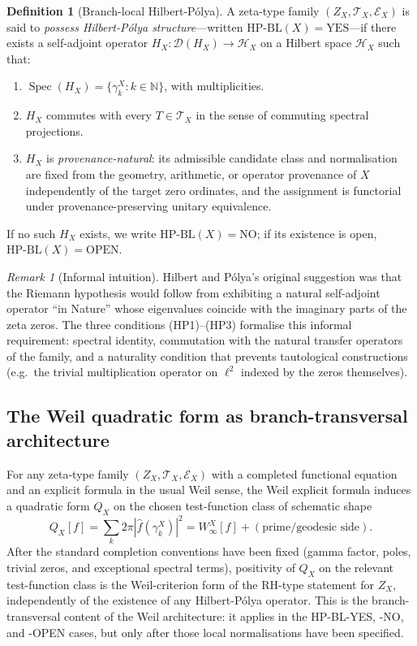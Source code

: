 \documentclass[11pt]{article}
\theoremstyle{definition}
\newtheorem{definition}[theorem]{Definition}
\theoremstyle{remark}
\newtheorem{remark}[theorem]{Remark}
\newcommand{\HBL}{\mathrm{HP\text{-}BL}}
\newcommand{\Spec}{\operatorname{Spec}}
\begin{document}
\begin{definition}[Branch-local Hilbert-P\'olya]\label{def:hp-bl}
A zeta-type family $(Z_X, \mathcal{T}_X, \mathcal{E}_X)$ is said to
\emph{possess Hilbert-P\'olya structure}---written $\HBL(X) =
\mathrm{YES}$---if there exists a self-adjoint operator
$H_X : \mathcal{D}(H_X) \to \mathcal{H}_X$ on a Hilbert space
$\mathcal{H}_X$ such that:
\begin{enumerate}
\item[(HP1)] $\Spec(H_X) = \{\gamma_k^X : k \in \mathbb{N}\}$, with
  multiplicities.
\item[(HP2)] $H_X$ commutes with every $T \in \mathcal{T}_X$ in the
  sense of commuting spectral projections.
\item[(HP3)] $H_X$ is \emph{provenance-natural}: its admissible
  candidate class and normalisation are fixed from the geometry,
  arithmetic, or operator provenance of $X$ independently of the
  target zero ordinates, and the assignment is functorial under
  provenance-preserving unitary equivalence.
\end{enumerate}
If no such $H_X$ exists, we write $\HBL(X) = \mathrm{NO}$;
if its existence is open, $\HBL(X) = \mathrm{OPEN}$.
\end{definition}

\begin{remark}[Informal intuition]\label{rem:hp-informal}
Hilbert and P\'olya's original suggestion was that the Riemann
hypothesis would follow from exhibiting a natural self-adjoint
operator ``in Nature'' whose eigenvalues coincide with the imaginary
parts of the zeta zeros. The three conditions (HP1)--(HP3) formalise
this informal requirement: spectral identity, commutation with the
natural transfer operators of the family, and a naturality condition
that prevents tautological constructions (e.g.\ the trivial
multiplication operator on $\ell^2$ indexed by the zeros themselves).
\end{remark}

\subsection{The Weil quadratic form as branch-transversal architecture}
\label{sec:weil-qf}

For any zeta-type family $(Z_X, \mathcal{T}_X, \mathcal{E}_X)$ with a
completed functional equation and an explicit formula in the usual
Weil sense, the Weil explicit formula \cite{Weil1952} induces a
quadratic form $Q_X$ on the chosen test-function class of schematic
shape
\begin{equation}
\label{eq:weil-qf-generic}
  Q_X[f] = \sum_k 2\pi |\widehat{f}(\gamma_k^X)|^2
    = W^X_\infty[f] + (\text{prime/geodesic side}).
\end{equation}
After the standard completion conventions have been fixed (gamma
factor, poles, trivial zeros, and exceptional spectral terms),
positivity of $Q_X$ on the relevant test-function class is the
Weil-criterion form of the RH-type statement for $Z_X$, independently
of the existence of any Hilbert-P\'olya operator. This is the
branch-transversal content of the Weil architecture: it applies in
the HP-BL-YES, -NO, and -OPEN cases, but only after those local
normalisations have been specified.
\end{document}
